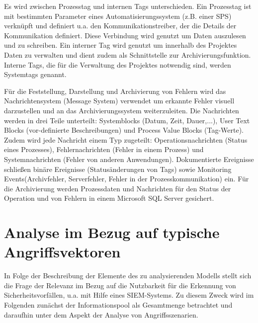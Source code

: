 Es wird zwischen Prozesstag und internen Tags unterschieden. Ein Prozesstag ist mit bestimmten Parameter eines Automatisierungssystem (z.B. einer SPS) verknüpft und definiert u.a. den Kommunikationstreiber, der die Details der Kommunikation definiert. Diese Verbindung wird genutzt um Daten auszulesen und zu schreiben. Ein interner Tag wird genutzt um innerhalb des Projektes Daten zu verwalten und dient zudem als Schnittstelle zur Archivierungsfunktion. Interne Tags, die für die Verwaltung des Projektes notwendig sind, werden Systemtags genannt.

Für die Feststellung, Darstellung und Archivierung von Fehlern wird das Nachrichtensystem (Message System) verwendet um erkannte Fehler visuell darzustellen und an das Archivierungssystem weiterzuleiten. Die Nachrichten werden in drei Teile unterteilt: Systemblocks (Datum, Zeit, Dauer,...), User Text Blocks (vor-definierte Beschreibungen) und Process Value Blocks (Tag-Werte). Zudem wird jede Nachricht einem Typ zugeteilt: Operationsnachrichten (Status eines Prozesses), Fehlernachrichten (Fehler in einem Prozess) und Systemnachrichten (Fehler von anderen Anwendungen).
Dokumentierte Ereignisse schließen binäre Ereignisse (Statusänderungen von Tags) sowie \glqq Monitoring Events\grqq  (Archivfehler, Serverfehler, Fehler in der Prozesskommunikation) ein. Für die Archivierung werden Prozessdaten und Nachrichten für den Status der Operation und von Fehlern in einem Microsoft SQL Server gesichert. 


\section{Analyse im Bezug auf typische Angriffsvektoren}
In Folge der Beschreibung der Elemente des zu analysierenden Modells stellt sich die Frage der Relevanz im Bezug auf die Nutzbarkeit für die Erkennung von Sicherheitsvorfällen, u.a. mit Hilfe eines SIEM-Systems. Zu diesem Zweck wird im Folgenden zunächst der Informationspool als Gesamtmenge betrachtet und daraufhin unter dem Aspekt der Analyse von Angriffsszenarien.

